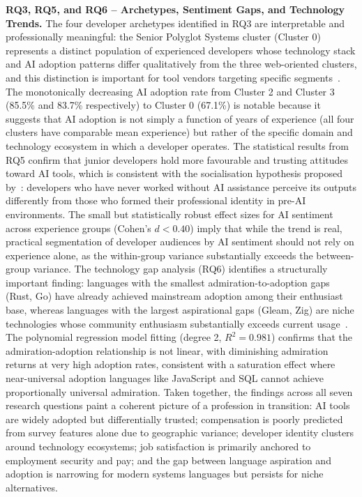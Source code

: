 \documentclass[journal, onecolumn]{IEEEtran}
\begin{document}
\textbf{RQ3, RQ5, and RQ6 -- Archetypes, Sentiment Gaps, and Technology Trends.}
The four developer archetypes identified in RQ3 are interpretable and professionally meaningful: the Senior Polyglot Systems cluster (Cluster 0) represents a distinct population of experienced developers whose technology stack and AI adoption patterns differ qualitatively from the three web-oriented clusters, and this distinction is important for tool vendors targeting specific segments~\cite{xu2022systematic}.
The monotonically decreasing AI adoption rate from Cluster 2 and Cluster 3 (85.5\% and 83.7\% respectively) to Cluster 0 (67.1\%) is notable because it suggests that AI adoption is not simply a function of years of experience (all four clusters have comparable mean experience) but rather of the specific domain and technology ecosystem in which a developer operates.
The statistical results from RQ5 confirm that junior developers hold more favourable and trusting attitudes toward AI tools, which is consistent with the socialisation hypothesis proposed by~\cite{mozannar2022reading}: developers who have never worked without AI assistance perceive its outputs differently from those who formed their professional identity in pre-AI environments.
The small but statistically robust effect sizes for AI sentiment across experience groups (Cohen's $d < 0.40$) imply that while the trend is real, practical segmentation of developer audiences by AI sentiment should not rely on experience alone, as the within-group variance substantially exceeds the between-group variance.
The technology gap analysis (RQ6) identifies a structurally important finding: languages with the smallest admiration-to-adoption gaps (Rust, Go) have already achieved mainstream adoption among their enthusiast base, whereas languages with the largest aspirational gaps (Gleam, Zig) are niche technologies whose community enthusiasm substantially exceeds current usage~\cite{storey2022disrupting}.
The polynomial regression model fitting (degree 2, $R^2 = 0.981$) confirms that the admiration-adoption relationship is not linear, with diminishing admiration returns at very high adoption rates, consistent with a saturation effect where near-universal adoption languages like JavaScript and SQL cannot achieve proportionally universal admiration.
Taken together, the findings across all seven research questions paint a coherent picture of a profession in transition: AI tools are widely adopted but differentially trusted; compensation is poorly predicted from survey features alone due to geographic variance; developer identity clusters around technology ecosystems; job satisfaction is primarily anchored to employment security and pay; and the gap between language aspiration and adoption is narrowing for modern systems languages but persists for niche alternatives.
\end{document}
